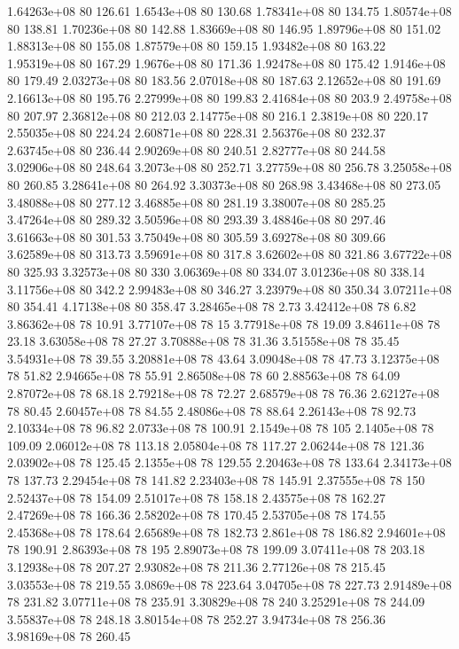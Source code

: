 1.64263e+08 80 126.61
1.6543e+08 80 130.68
1.78341e+08 80 134.75
1.80574e+08 80 138.81
1.70236e+08 80 142.88
1.83669e+08 80 146.95
1.89796e+08 80 151.02
1.88313e+08 80 155.08
1.87579e+08 80 159.15
1.93482e+08 80 163.22
1.95319e+08 80 167.29
1.9676e+08 80 171.36
1.92478e+08 80 175.42
1.9146e+08 80 179.49
2.03273e+08 80 183.56
2.07018e+08 80 187.63
2.12652e+08 80 191.69
2.16613e+08 80 195.76
2.27999e+08 80 199.83
2.41684e+08 80 203.9
2.49758e+08 80 207.97
2.36812e+08 80 212.03
2.14775e+08 80 216.1
2.3819e+08 80 220.17
2.55035e+08 80 224.24
2.60871e+08 80 228.31
2.56376e+08 80 232.37
2.63745e+08 80 236.44
2.90269e+08 80 240.51
2.82777e+08 80 244.58
3.02906e+08 80 248.64
3.2073e+08 80 252.71
3.27759e+08 80 256.78
3.25058e+08 80 260.85
3.28641e+08 80 264.92
3.30373e+08 80 268.98
3.43468e+08 80 273.05
3.48088e+08 80 277.12
3.46885e+08 80 281.19
3.38007e+08 80 285.25
3.47264e+08 80 289.32
3.50596e+08 80 293.39
3.48846e+08 80 297.46
3.61663e+08 80 301.53
3.75049e+08 80 305.59
3.69278e+08 80 309.66
3.62589e+08 80 313.73
3.59691e+08 80 317.8
3.62602e+08 80 321.86
3.67722e+08 80 325.93
3.32573e+08 80 330
3.06369e+08 80 334.07
3.01236e+08 80 338.14
3.11756e+08 80 342.2
2.99483e+08 80 346.27
3.23979e+08 80 350.34
3.07211e+08 80 354.41
4.17138e+08 80 358.47
3.28465e+08 78 2.73
3.42412e+08 78 6.82
3.86362e+08 78 10.91
3.77107e+08 78 15
3.77918e+08 78 19.09
3.84611e+08 78 23.18
3.63058e+08 78 27.27
3.70888e+08 78 31.36
3.51558e+08 78 35.45
3.54931e+08 78 39.55
3.20881e+08 78 43.64
3.09048e+08 78 47.73
3.12375e+08 78 51.82
2.94665e+08 78 55.91
2.86508e+08 78 60
2.88563e+08 78 64.09
2.87072e+08 78 68.18
2.79218e+08 78 72.27
2.68579e+08 78 76.36
2.62127e+08 78 80.45
2.60457e+08 78 84.55
2.48086e+08 78 88.64
2.26143e+08 78 92.73
2.10334e+08 78 96.82
2.0733e+08 78 100.91
2.1549e+08 78 105
2.1405e+08 78 109.09
2.06012e+08 78 113.18
2.05804e+08 78 117.27
2.06244e+08 78 121.36
2.03902e+08 78 125.45
2.1355e+08 78 129.55
2.20463e+08 78 133.64
2.34173e+08 78 137.73
2.29454e+08 78 141.82
2.23403e+08 78 145.91
2.37555e+08 78 150
2.52437e+08 78 154.09
2.51017e+08 78 158.18
2.43575e+08 78 162.27
2.47269e+08 78 166.36
2.58202e+08 78 170.45
2.53705e+08 78 174.55
2.45368e+08 78 178.64
2.65689e+08 78 182.73
2.861e+08 78 186.82
2.94601e+08 78 190.91
2.86393e+08 78 195
2.89073e+08 78 199.09
3.07411e+08 78 203.18
3.12938e+08 78 207.27
2.93082e+08 78 211.36
2.77126e+08 78 215.45
3.03553e+08 78 219.55
3.0869e+08 78 223.64
3.04705e+08 78 227.73
2.91489e+08 78 231.82
3.07711e+08 78 235.91
3.30829e+08 78 240
3.25291e+08 78 244.09
3.55837e+08 78 248.18
3.80154e+08 78 252.27
3.94734e+08 78 256.36
3.98169e+08 78 260.45
